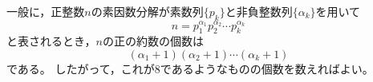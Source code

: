 \documentclass{article}
\begin{document}
一般に，正整数$n$の素因数分解が素数列$\{p_k\}$と非負整数列$\{\alpha_k\}$を用いて
$$n = p_1^{\alpha_1} p_2^{\alpha_2} \cdots p_k^{\alpha_k}$$
と表されるとき，$n$の正の約数の個数は
$$(\alpha_1 + 1) (\alpha_2 + 1) \cdots (\alpha_k + 1)$$
である。
したがって，これが8であるようなものの個数を数えればよい。
\end{document}

